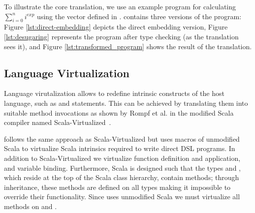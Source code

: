 To illustrate the core translation, we use an example program for calculating $\sum_{i=0}^n i^{exp}$ using the vector \edsl defined in .  contains three versions of the program: Figure \ref{lst:direct-embedding} depicts the direct embedding version, Figure \ref{lst:desugaring} represents the program after type checking (as the translation sees it), and Figure \ref{lst:transformed_program} shows the result of the translation.

\subsection{Language Virtualization}

Language virutalization allows to redefine intrinsic constructs of the
host language, such as  and  statements. This can be
achieved by translating them into suitable method invocations as shown by Rompf
et al. in the modified Scala compiler named Scala-Virtualized~\cite{rompf_scala-virtualized:_2009}.

 \tool follows the same approach as Scala-Virtualized but uses macros of unmodified Scala
 to virtualize Scala intrinsics required to write direct DSL programs. In addition to
 Scala-Virtualized we virtualize function definition and application, and
 variable binding. Furthermore, Scala is designed such that the types  and
 , which reside at the top of the Scala class hierarchy, contain
  methods; through inheritance, these methods are defined on all
 types making it impossible to override their functionality. Since \tool uses
 unmodified Scala we must virtualize all methods on  and .

